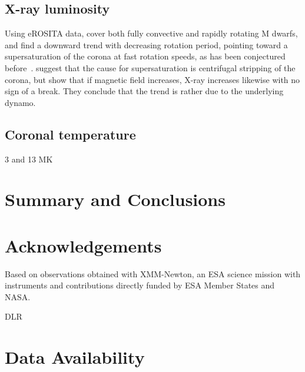 \documentclass[twocolumn]{aastex631}
\begin{document}
\subsection{X-ray luminosity}
\label{sec:discussion:xraylum}




Using eROSITA data, \citet{magaudda2022first} cover both fully convective and rapidly rotating M dwarfs, and find a downward trend with decreasing rotation period, pointing toward a supersaturation of the corona at fast rotation speeds, as has been conjectured before~\citep{jeffries2011investigating,ramsay2020tess}. \citet{jeffries2011investigating} suggest that the cause for supersaturation is centrifugal stripping of the corona, but \citet{reiners2022magnetism} show that if magnetic field increases, X-ray increases likewise with no sign of a break. They conclude that the trend is rather due to the underlying dynamo.

\cite{brown2023coronal}

\cite{johnstone2012soft}


\subsection{Coronal temperature}
\label{sec:discussion:xraytemp}

3 and 13 MK




\section{Summary and Conclusions}


\section*{Acknowledgements}
\citep{lightkurvecollaboration2018lightkurve}
Based on observations obtained with XMM-Newton, an ESA science mission with instruments and contributions directly funded by ESA Member States and NASA.

DLR
\section*{Data Availability}



\end{document}
